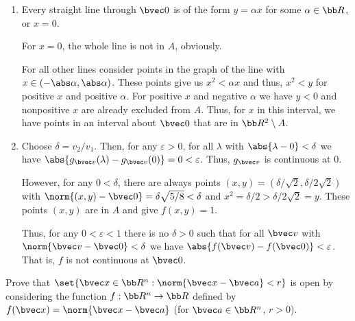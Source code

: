 \documentclass[12pt, letterpaper]{hmcpset}
\begin{document}
\begin{solution}
	\begin{enumerate}
		\item Every straight line through $\bvec 0$ is of the form $y = \alpha x$ for some $\alpha \in \bb R$, or $x = 0$.

			For $x = 0$, the whole line is not in $A$, obviously. 

			For all other lines consider points in the graph of the line with $x \in (-\abs \alpha, \abs \alpha)$. These points give us $x^2 < \alpha x$ and thus, $x^2 < y$ for positive $x$ and positive $\alpha$. For positive $x$ and negative $\alpha$ we have $y < 0$ and nonpositive $x$ are already excluded from $A$. Thus, for $x$ in this interval, we have points in an interval about $\bvec 0$ that are in $\bb R^2 \setminus A$.
		\item Choose $\delta = v_{2}/v_{1}$. Then, for any $\varepsilon > 0$, for all $\lambda$ with $\abs{\lambda - 0} < \delta$ we have $\abs{g_{\bvec v}(\lambda) - g_{\bvec v}(0)} = 0 < \varepsilon$. Thus, $g_{\bvec v}$ is continuous at $0$.

			However, for any $0 < \delta$, there are always points $(x, y) = (\delta/\sqrt{2}, \delta/2 \sqrt{2})$ with $\norm{(x, y) - \bvec 0} = \delta \sqrt{5/8} < \delta$ and $x^2 = \delta/2 > \delta/2 \sqrt{2} = y$. These points $(x, y)$ are in $A$ and give $f(x,y) = 1$.
			
			Thus, for any $0 < \varepsilon < 1$ there is no $\delta > 0$ such that for all $\bvec v$ with $\norm{\bvec v - \bvec 0} < \delta$ we have $\abs{f(\bvec v) - f(\bvec 0)} < \varepsilon$. That is, $f$ is not continuous at $\bvec 0$.
	\end{enumerate}
\end{solution}

\pagebreak

\begin{problem}[27]
	Prove that $\set{\bvec x \in \bb R^n : \norm{\bvec x - \bvec a} < r}$ is open by considering the function $f : \bb R^n \to \bb R$ defined by $f(\bvec x) = \norm{\bvec x - \bvec a}$ (for $\bvec a \in \bb R^n$, $r > 0$).
\end{problem}
\end{document}
